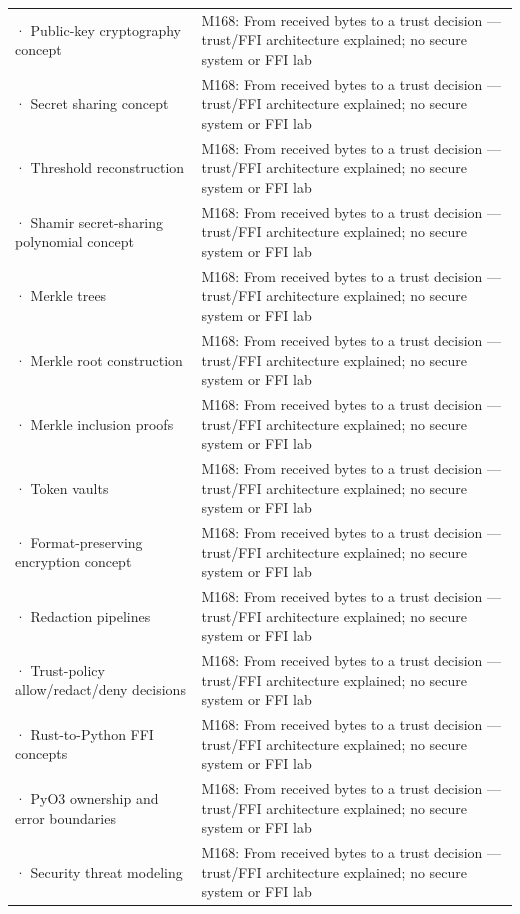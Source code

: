 {\begin{longtable}[]{@{}
  >{\raggedright\arraybackslash}p{}
  >{\raggedright\arraybackslash}p{}@{}}
2785 · Public-key cryptography concept & M168: From received bytes to a trust decision --- trust/FFI architecture explained; no secure system or FFI lab \\
2786 · Secret sharing concept & M168: From received bytes to a trust decision --- trust/FFI architecture explained; no secure system or FFI lab \\
2787 · Threshold reconstruction & M168: From received bytes to a trust decision --- trust/FFI architecture explained; no secure system or FFI lab \\
2788 · Shamir secret-sharing polynomial concept & M168: From received bytes to a trust decision --- trust/FFI architecture explained; no secure system or FFI lab \\
2789 · Merkle trees & M168: From received bytes to a trust decision --- trust/FFI architecture explained; no secure system or FFI lab \\
2790 · Merkle root construction & M168: From received bytes to a trust decision --- trust/FFI architecture explained; no secure system or FFI lab \\
2791 · Merkle inclusion proofs & M168: From received bytes to a trust decision --- trust/FFI architecture explained; no secure system or FFI lab \\
2792 · Token vaults & M168: From received bytes to a trust decision --- trust/FFI architecture explained; no secure system or FFI lab \\
2793 · Format-preserving encryption concept & M168: From received bytes to a trust decision --- trust/FFI architecture explained; no secure system or FFI lab \\
2794 · Redaction pipelines & M168: From received bytes to a trust decision --- trust/FFI architecture explained; no secure system or FFI lab \\
2795 · Trust-policy allow/redact/deny decisions & M168: From received bytes to a trust decision --- trust/FFI architecture explained; no secure system or FFI lab \\
2796 · Rust-to-Python FFI concepts & M168: From received bytes to a trust decision --- trust/FFI architecture explained; no secure system or FFI lab \\
2797 · PyO3 ownership and error boundaries & M168: From received bytes to a trust decision --- trust/FFI architecture explained; no secure system or FFI lab \\
2798 · Security threat modeling & M168: From received bytes to a trust decision --- trust/FFI architecture explained; no secure system or FFI lab \\

\end{longtable}}
